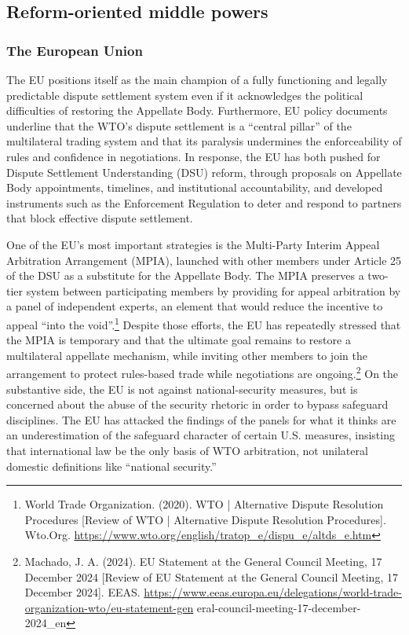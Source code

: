 \subsection{Reform-oriented middle powers}

\subsubsection{The European Union}

The EU positions itself as the main champion of a fully functioning and legally predictable dispute settlement system even if it acknowledges the political difficulties of restoring the Appellate Body. Furthermore, EU policy documents underline that the WTO’s dispute settlement is a “central pillar” of the multilateral trading system and that its paralysis undermines the enforceability of rules and confidence in negotiations. In response, the EU has both pushed for Dispute Settlement Understanding (DSU) reform, through proposals on Appellate Body appointments, timelines, and institutional accountability, and developed instruments such as the Enforcement Regulation to deter and respond to partners that block effective dispute settlement.

One of the EU’s most important strategies is the Multi-Party Interim Appeal Arbitration Arrangement (MPIA), launched with other members under Article 25 of the DSU as a substitute for the Appellate Body. The MPIA preserves a two-tier system between participating members by providing for appeal arbitration by a panel of independent experts, an element that would reduce the incentive to appeal “into the void”.\footnote{World Trade Organization. (2020). WTO | Alternative Dispute Resolution Procedures [Review of WTO | Alternative Dispute Resolution Procedures]. Wto.Org. \url{https://www.wto.org/english/tratop_e/dispu_e/altds_e.htm}} Despite those efforts, the EU has repeatedly stressed that the MPIA is temporary and that the ultimate goal remains to restore a multilateral appellate mechanism, while inviting other members to join the arrangement to protect rules-based trade while negotiations are ongoing.\footnote{Machado, J. A. (2024). EU Statement at the General Council Meeting, 17 December 2024 [Review of EU Statement at the General Council Meeting, 17 December 2024]. EEAS. \url{https://www.eeas.europa.eu/delegations/world-trade-organization-wto/eu-statement-gen} eral-council-meeting-17-december-2024\_en} On the substantive side, the EU is not against national-security measures, but is concerned about the abuse of the security rhetoric in order to bypass safeguard disciplines. The EU has attacked the findings of the panels for what it thinks are an underestimation of the safeguard character of certain U.S. measures, insisting that international law be the only basis of WTO arbitration, not unilateral domestic definitions like “national security.”

